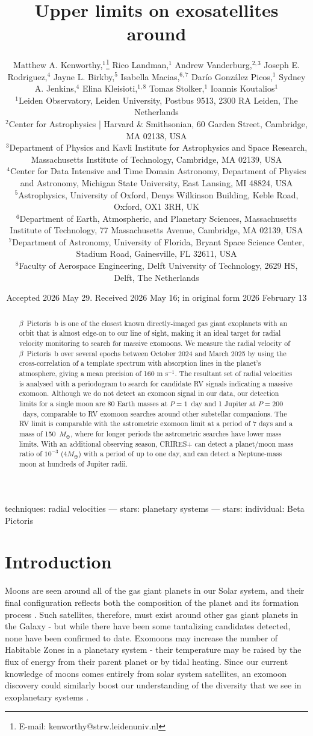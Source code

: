 \documentclass[fleqn,usenatbib]{mnras}
\title[\bpb{} exosatellite limits]{Upper limits on exosatellites around \bpb{}}
\author[M. A. Kenworthy et al.]{Matthew A. Kenworthy,$^{1}$\thanks{E-mail: kenworthy@strw.leidenuniv.nl}
Rico Landman,$^{1}$
Andrew Vanderburg,$^{2,3}$
Joseph E. Rodriguez,$^{4}$\newauthor
Jayne L. Birkby,$^{5}$
Isabella Macias,$^{6,7}$
Dar{\'i}o Gonz{\'a}lez Picos,$^{1}$
Sydney A. Jenkins,$^{4}$
Elina Kleisioti,$^{1,8}$\newauthor
Tomas Stolker,$^{1}$
Ioannis Koutalios$^{1}$
\\
$^{1}$Leiden Observatory, Leiden University, Postbus 9513, 2300 RA Leiden, The Netherlands\\
$^{2}$Center for Astrophysics | Harvard \& Smithsonian, 60 Garden Street, Cambridge, MA 02138, USA\\
$^{3}$Department of Physics and Kavli Institute for Astrophysics and Space Research, Massachusetts Institute of Technology, Cambridge, MA 02139, USA\\
$^{4}$Center for Data Intensive and Time Domain Astronomy, Department of Physics and Astronomy, Michigan State University, East Lansing, MI 48824, USA\\
$^{5}$Astrophysics, University of Oxford, Denys Wilkinson Building, Keble Road, Oxford, OX1 3RH, UK\\
$^{6}$Department of Earth, Atmospheric, and Planetary Sciences, Massachusetts Institute of Technology, 77 Massachusetts Avenue, Cambridge, MA 02139, USA\\
$^{7}$Department of Astronomy, University of Florida, Bryant Space Science Center, Stadium Road, Gainesville, FL 32611, USA\\
$^{8}$Faculty of Aerospace Engineering, Delft University of Technology, 2629 HS, Delft, The Netherlands
}
\date{Accepted 2026 May 29. Received 2026 May 16; in original form 2026 February 13}
\newcommand{\ms}{m s$^{-1}$}
\newcommand{\bpb}{$\beta$~Pictoris~b}
\begin{document}
\maketitle

\begin{abstract}
   \bpb{} is one of the closest known directly-imaged gas giant exoplanets with an orbit that is almost edge-on to our line of sight, making it an ideal target for radial velocity monitoring to search for massive exomoons.
%
We measure the radial velocity of \bpb{} over several epochs between October 2024 and March 2025 by using the cross-correlation of a template spectrum with absorption lines in the planet's atmosphere, giving a mean precision of 160 \ms{}.
%
The resultant set of radial velocities is analysed with a periodogram to search for candidate RV signals indicating a massive exomoon.  
%
Although we do not detect an exomoon signal in our data, our detection limits for a single moon are 80 Earth masses at $P=1$~day and 1 Jupiter at $P=200$~days, comparable to RV exomoon searches around other substellar companions.
%
The RV limit is comparable with the astrometric exomoon limit at a period of 7 days and a mass of 150~$M_\oplus$, where for longer periods the astrometric searches have lower mass limits.
%
With an additional observing season, CRIRES+ can detect a planet/moon mass ratio of $10^{-3}$ ($4M_\oplus$) with a period of up to one day, and can detect a Neptune-mass moon at hundreds of Jupiter radii.
\end{abstract}

\begin{keywords}techniques: radial velocities --- stars: planetary systems --- stars: individual: Beta Pictoris\end{keywords}


\section{Introduction}

Moons are seen around all of the gas giant planets in our Solar system, and their final configuration reflects both the composition of the planet and its formation process \citep[e.g.][]{Deienno11}.
%
Such satellites, therefore, must exist around other gas giant planets in the Galaxy - but while there have been some tantalizing candidates detected, none have been confirmed to date.
%
Exomoons may increase the number of Habitable Zones in a planetary system - their temperature may be raised by the flux of energy from their parent planet \citep{Heller13} or by tidal heating.
%
Since our current knowledge of moons comes entirely from solar system satellites, an exomoon discovery could similarly boost our understanding of the diversity that we see in exoplanetary systems \citep[e.g.][]{Batalha14}.
\end{document}
